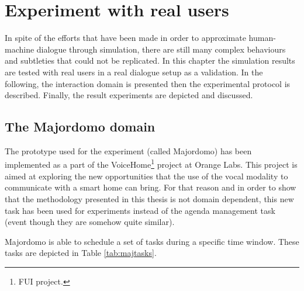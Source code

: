 \chapter{Experiment with real users}

\label{ch:experiment}

	In spite of the efforts that have been made in order to approximate human-machine dialogue through simulation, there are still many complex behaviours and subtleties that could not be replicated. In this chapter the simulation results are tested with real users in a real dialogue setup as a validation. In the following, the interaction domain is presented then the experimental protocol is described. Finally, the result experiments are depicted and discussed.

\section{The Majordomo domain}

	The prototype used for the experiment (called Majordomo) has been implemented as a part of the VoiceHome\footnote{FUI project.} project at Orange Labs. This project is aimed at exploring the new opportunities that the use of the vocal modality to communicate with a smart home can bring. For that reason and in order to show that the methodology presented in this thesis is not domain dependent, this new task has been used for experiments instead of the agenda management task (event though they are somehow quite similar).
	
	Majordomo is able to schedule a set of tasks during a specific time window. These tasks are depicted in Table \ref{tab:majtasks}.

